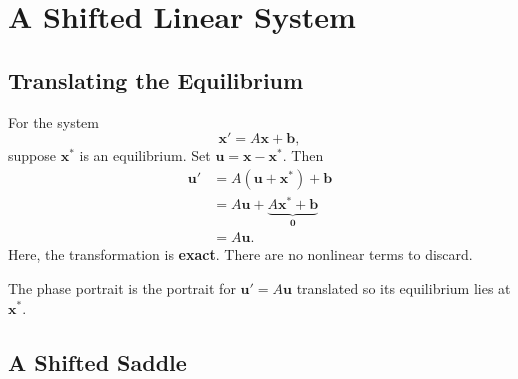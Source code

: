 \documentclass[10pt,letterpaper]{article}
\begin{document}
\section{A Shifted Linear System}

\subsection{Translating the Equilibrium}

For the system
\[
\mathbf{x}'=A\mathbf{x}+\mathbf{b},
\]
suppose $\mathbf{x}^*$ is an equilibrium. Set
$\mathbf{u}=\mathbf{x}-\mathbf{x}^*$. Then
\begin{align*}
\mathbf{u}'
&=A(\mathbf{u}+\mathbf{x}^*)+\mathbf{b}\\
&=A\mathbf{u}
+\underbrace{A\mathbf{x}^*+\mathbf{b}}_{\mathbf{0}}\\
&=A\mathbf{u}.
\end{align*}
Here, the transformation is \textbf{exact}.
There are no nonlinear terms to discard.

The phase portrait is the portrait for
$\mathbf{u}'=A\mathbf{u}$ translated so its equilibrium
lies at $\mathbf{x}^*$.

\subsection{A Shifted Saddle}
\end{document}

